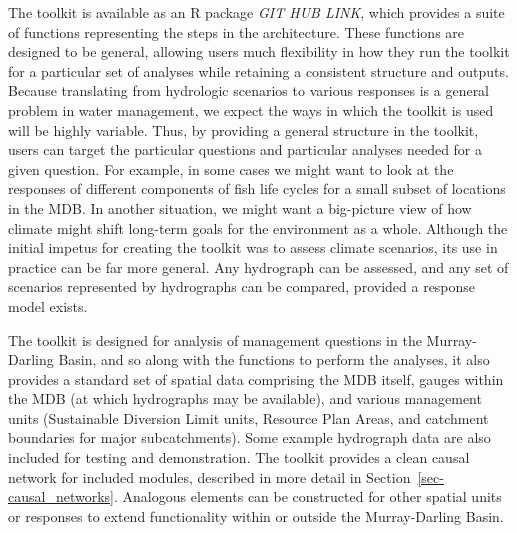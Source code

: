\documentclass[
  number]{elsarticle}
\begin{document}
The toolkit is available as an R package \emph{GIT HUB LINK}, which
provides a suite of functions representing the steps in the
architecture. These functions are designed to be general, allowing users
much flexibility in how they run the toolkit for a particular set of
analyses while retaining a consistent structure and outputs. Because
translating from hydrologic scenarios to various responses is a general
problem in water management, we expect the ways in which the toolkit is
used will be highly variable. Thus, by providing a general structure in
the toolkit, users can target the particular questions and particular
analyses needed for a given question. For example, in some cases we
might want to look at the responses of different components of fish life
cycles for a small subset of locations in the MDB. In another situation,
we might want a big-picture view of how climate might shift long-term
goals for the environment as a whole. Although the initial impetus for
creating the toolkit was to assess climate scenarios, its use in
practice can be far more general. Any hydrograph can be assessed, and
any set of scenarios represented by hydrographs can be compared,
provided a response model exists.

The toolkit is designed for analysis of management questions in the
Murray-Darling Basin, and so along with the functions to perform the
analyses, it also provides a standard set of spatial data comprising the
MDB itself, gauges within the MDB (at which hydrographs may be
available), and various management units (Sustainable Diversion Limit
units, Resource Plan Areas, and catchment boundaries for major
subcatchments). Some example hydrograph data are also included for
testing and demonstration. The toolkit provides a clean causal network
for included modules, described in more detail in
Section~\ref{sec-causal_networks}. Analogous elements can be constructed
for other spatial units or responses to extend functionality within or
outside the Murray-Darling Basin.
\end{document}
